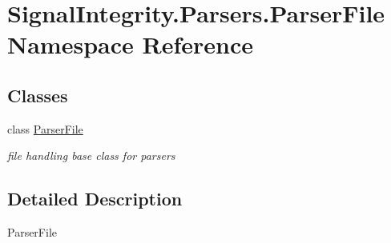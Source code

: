 \hypertarget{namespaceSignalIntegrity_1_1Parsers_1_1ParserFile}{}\section{Signal\+Integrity.\+Parsers.\+Parser\+File Namespace Reference}
\label{namespaceSignalIntegrity_1_1Parsers_1_1ParserFile}
\subsection*{Classes}
\begin{DoxyCompactItemize}
\item 
class \hyperlink{classSignalIntegrity_1_1Parsers_1_1ParserFile_1_1ParserFile}{Parser\+File}
\begin{DoxyCompactList}\small\item\em file handling base class for parsers \end{DoxyCompactList}\end{DoxyCompactItemize}


\subsection{Detailed Description}
\begin{DoxyVerb}ParserFile\end{DoxyVerb}
 